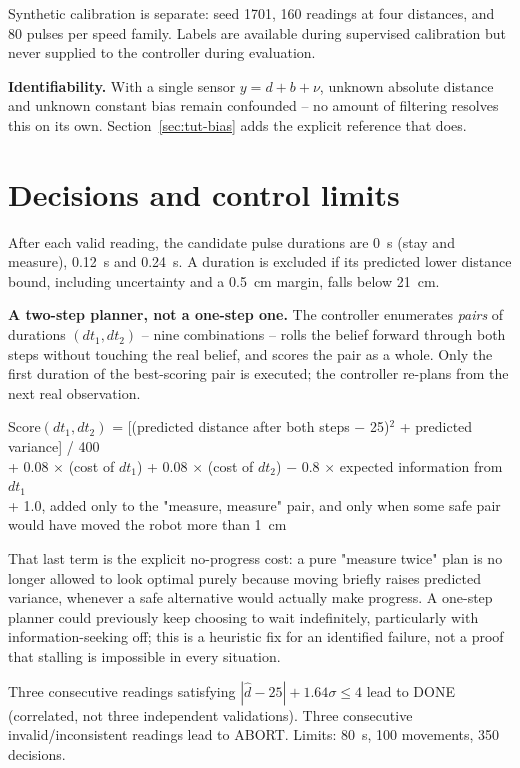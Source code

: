 \documentclass[11pt,a4paper]{article}
\newcommand{\notice}[1]{\par\noindent\colorbox{ice}{\parbox{.95\linewidth}{\vspace{2pt}#1\vspace{2pt}}}\par\vspace{4pt}}
\begin{document}
Synthetic calibration is separate: seed 1701, 160 readings at four distances, and 80 pulses per speed family. Labels are available during supervised calibration but never supplied to the controller during evaluation.

\notice{\textbf{Identifiability.} With a single sensor $y=d+b+\nu$, unknown absolute distance and unknown constant bias remain confounded -- no amount of filtering resolves this on its own. Section~\ref{sec:tut-bias} adds the explicit reference that does.}

\section{Decisions and control limits}
\label{sec:tut-decisions}
After each valid reading, the candidate pulse durations are 0~s (stay and measure), 0.12~s and 0.24~s. A duration is excluded if its predicted lower distance bound, including uncertainty and a 0.5~cm margin, falls below 21~cm.

\textbf{A two-step planner, not a one-step one.} The controller enumerates \emph{pairs} of durations $(dt_1,dt_2)$ -- nine combinations -- rolls the belief forward through both steps without touching the real belief, and scores the pair as a whole. Only the first duration of the best-scoring pair is executed; the controller re-plans from the next real observation.
\begin{center}\small\colorbox{ice}{\parbox{.92\linewidth}{
Score$(dt_1,dt_2)$ = [(predicted distance after both steps $-$ 25)$^2$ + predicted variance] / 400\\
\hspace*{2em}+ 0.08 $\times$ (cost of $dt_1$) + 0.08 $\times$ (cost of $dt_2$) $-$ 0.8 $\times$ expected information from $dt_1$\\
\hspace*{2em}+ 1.0, added only to the "measure, measure" pair, and only when some safe pair would have moved the robot more than 1~cm}}\end{center}
That last term is the explicit no-progress cost: a pure "measure twice" plan is no longer allowed to look optimal purely because moving briefly raises predicted variance, whenever a safe alternative would actually make progress. A one-step planner could previously keep choosing to wait indefinitely, particularly with information-seeking off; this is a heuristic fix for an identified failure, not a proof that stalling is impossible in every situation.

Three consecutive readings satisfying $|\hat d-25|+1.64\sigma\leq4$ lead to DONE (correlated, not three independent validations). Three consecutive invalid/inconsistent readings lead to ABORT. Limits: 80~s, 100 movements, 350 decisions.
\end{document}

